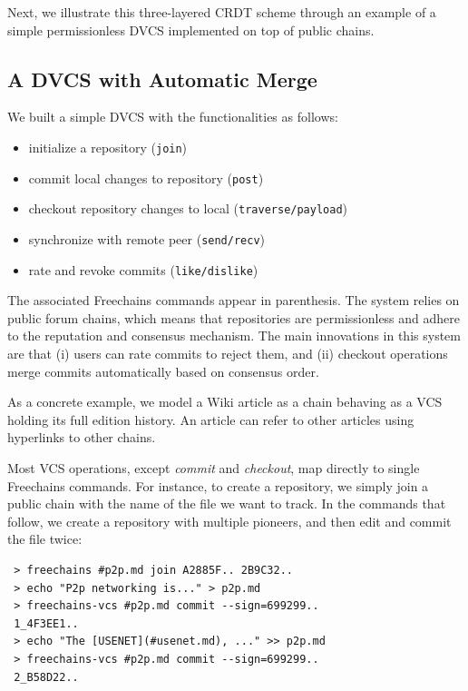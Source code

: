 \documentclass[10pt,journal,compsoc]{IEEEtran}
\newcommand{\FC}       {Freechains\xspace}
\begin{document}
Next, we illustrate this three-layered CRDT scheme through an example of a
simple permissionless DVCS implemented on top of public chains.

\subsection{A DVCS with Automatic Merge}

We built a simple DVCS with the functionalities as follows:
%
\begin{itemize}
    \setlength{\itemindent}{-8pt}
    \item initialize a repository (\texttt{\scriptsize{join}})
    \item commit local changes to repository (\texttt{\scriptsize{post}})
    \item checkout repository changes to local (\texttt{\scriptsize{traverse/payload}})
    \item synchronize with remote peer (\texttt{\scriptsize{send/recv}})
    \item rate and revoke commits (\texttt{\scriptsize{like/dislike}})
\end{itemize}
%
The associated \FC commands appear in parenthesis.
%
The system relies on public forum chains, which means that repositories are
permissionless and adhere to the reputation and consensus mechanism.
The main innovations in this system are that
    (i)  users can rate commits to reject them, and
    (ii) checkout operations merge commits automatically based on consensus order.

As a concrete example, we model a Wiki article as a chain behaving as a VCS
holding its full edition history.
An article can refer to other articles using hyperlinks to other chains.

Most VCS operations, except \emph{commit} and \emph{checkout}, map directly to
single \FC commands.
For instance, to create a repository, we simply join a public chain with the
name of the file we want to track.
In the commands that follow, we create a repository with multiple pioneers, and
then edit and commit the file twice:

{\footnotesize
\begin{verbatim}
 > freechains #p2p.md join A2885F.. 2B9C32..
 > echo "P2p networking is..." > p2p.md
 > freechains-vcs #p2p.md commit --sign=699299..
 1_4F3EE1..
 > echo "The [USENET](#usenet.md), ..." >> p2p.md
 > freechains-vcs #p2p.md commit --sign=699299..
 2_B58D22..
\end{verbatim}
}
\end{document}

